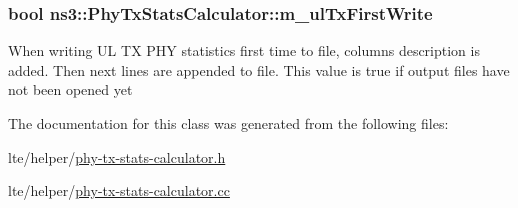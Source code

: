 \subsubsection[{\texorpdfstring{m\+\_\+ul\+Tx\+First\+Write}{m_ulTxFirstWrite}}]{\setlength{\rightskip}{0pt plus 5cm}bool ns3\+::\+Phy\+Tx\+Stats\+Calculator\+::m\+\_\+ul\+Tx\+First\+Write\hspace{0.3cm}{\ttfamily [private]}}\hypertarget{classns3_1_1PhyTxStatsCalculator_a1328443e41261755f0d22cdeef281ef5}{}\label{classns3_1_1PhyTxStatsCalculator_a1328443e41261755f0d22cdeef281ef5}
When writing UL TX P\+HY statistics first time to file, columns description is added. Then next lines are appended to file. This value is true if output files have not been opened yet 

The documentation for this class was generated from the following files\+:\begin{DoxyCompactItemize}
\item 
lte/helper/\hyperlink{phy-tx-stats-calculator_8h}{phy-\/tx-\/stats-\/calculator.\+h}\item 
lte/helper/\hyperlink{phy-tx-stats-calculator_8cc}{phy-\/tx-\/stats-\/calculator.\+cc}\end{DoxyCompactItemize}

